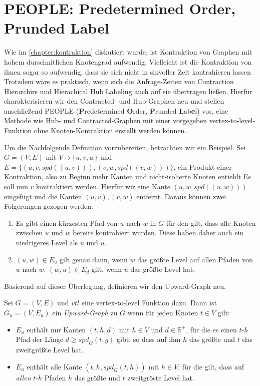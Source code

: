 \chapter{PEOPLE: Predetermined Order, Prunded Label}\label{chapter:peopel}

Wie im \autoref{chapter:kontraktion} diskutiert wurde, ist Kontraktion von Graphen mit hohem durschnitlichen Knotengrad aufwendig.
Vielleicht ist die Kontraktion von ihnen sogar so aufwendig, dass sie sich nicht in sinvoller Zeit kontrahieren lassen
Trotzdem wäre es praktisch, wenn sich die Anfrage-Zeiten von Contraction Hierarchirs und Hierachical Hub Labeling auch auf sie übertragen ließen.
Hierfür charakterisieren wir den Contracted- und Hub-Graphen neu und stellen anschließend PEOPLE (\textbf{P}redetermined \textbf{O}rder, \textbf{P}runded \textbf{L}ab\textbf{e}l) vor, eine Methode wie Hub- und Contracted-Graphen mit einer vorgegeben vertex-to-level-Funktion ohne Knoten-Kontraktion erstellt werden können.

Um die Nachfolgende Definition vorzubereiten, betrachten wir ein Beispiel.
Sei $G = (V, E)$ mit $V \supset \{ u, v, w \}$ und $E = \{ (u, v, {spd}((u, v))), (v, w, {spd}((v, w))) \}$, ein Produkt einer Kontraktion, also zu Beginn mehr Kanten und nicht-isolierte Knoten entiehlt
Es soll nun $v$ kontraktiert werden.
Hierfür wir eine Kante $(u, w, {spd}((u, w)))$ eingefügt und die Kanten $(u, v), (v, w)$ entfernt.
Daraus können zwei Folgerungen gezogen werden:

\begin{enumerate}
  \item
    Es gibt einen kürzesten Pfad von $u$ nach $w$ in $G$ für den gilt, dass alle Knoten zwischen $u$ und $w$ bereits kontrahiert wurden.
    Diese haben daher auch ein niedrigeres Level als $u$ und $u$.

  \item
    $(u, w) \in E_u$ gilt genau dann, wenn $w$ das größte Level auf allen Pfaden von $u$ nach $w$.
    $(w, u) \in E_d$ gilt, wenn $u$ das größte Level hat.
\end{enumerate}

Basierend auf dieser Überlegung, definieren wir den Upward-Graph neu.

\begin{definition}\label{people:def:upward_graph}
  Sei $G = (V, E)$ und ${vtl}$ eine vertex-to-level Funktion dazu.
  Dann ist $G_u = (V, E_u)$ ein \emph{Upward-Graph} zu $G$ wenn für jeden Knoten $t \in V$ gilt:

  \begin{itemize}
    \item
      $E_u$ enthält nur Kanten $(t, h, d)$ mit $h \in V$ und $d \in \mathbb{R}^+$, für die es einen $t$-$h$ Pfad der Länge $d \geq {spd}_G (t, g)$ gibt, so dass auf ihm $h$ das größte und $t$ das zweitgrößte Level hat.

    \item
      $E_u$ enthält alle Kante $(t, h, {spd}_G (t, h))$ mit $h \in V$, für die gilt, dass auf \emph{allen} $t$-$h$ Pfaden $h$ das größte und $t$ zweitgröste Level hat.
  \end{itemize}
\end{definition}

